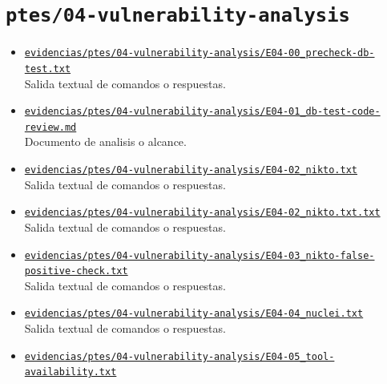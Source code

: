 \section{\texorpdfstring{\nolinkurl{ptes/04-vulnerability-analysis}}{ptes/04-vulnerability-analysis}}
\begin{itemize}[leftmargin=1.2em]
  \item \href{https://github.com/gamurigm/inventrack-ptes-report/blob/main/evidencias/ptes/04-vulnerability-analysis/E04-00_precheck-db-test.txt}{\nolinkurl{evidencias/ptes/04-vulnerability-analysis/E04-00_precheck-db-test.txt}}\\
  {\small Salida textual de comandos o respuestas.}
  \item \href{https://github.com/gamurigm/inventrack-ptes-report/blob/main/evidencias/ptes/04-vulnerability-analysis/E04-01_db-test-code-review.md}{\nolinkurl{evidencias/ptes/04-vulnerability-analysis/E04-01_db-test-code-review.md}}\\
  {\small Documento de analisis o alcance.}
  \item \href{https://github.com/gamurigm/inventrack-ptes-report/blob/main/evidencias/ptes/04-vulnerability-analysis/E04-02_nikto.txt}{\nolinkurl{evidencias/ptes/04-vulnerability-analysis/E04-02_nikto.txt}}\\
  {\small Salida textual de comandos o respuestas.}
  \item \href{https://github.com/gamurigm/inventrack-ptes-report/blob/main/evidencias/ptes/04-vulnerability-analysis/E04-02_nikto.txt.txt}{\nolinkurl{evidencias/ptes/04-vulnerability-analysis/E04-02_nikto.txt.txt}}\\
  {\small Salida textual de comandos o respuestas.}
  \item \href{https://github.com/gamurigm/inventrack-ptes-report/blob/main/evidencias/ptes/04-vulnerability-analysis/E04-03_nikto-false-positive-check.txt}{\nolinkurl{evidencias/ptes/04-vulnerability-analysis/E04-03_nikto-false-positive-check.txt}}\\
  {\small Salida textual de comandos o respuestas.}
  \item \href{https://github.com/gamurigm/inventrack-ptes-report/blob/main/evidencias/ptes/04-vulnerability-analysis/E04-04_nuclei.txt}{\nolinkurl{evidencias/ptes/04-vulnerability-analysis/E04-04_nuclei.txt}}\\
  {\small Salida textual de comandos o respuestas.}
  \item \href{https://github.com/gamurigm/inventrack-ptes-report/blob/main/evidencias/ptes/04-vulnerability-analysis/E04-05_tool-availability.txt}{\nolinkurl{evidencias/ptes/04-vulnerability-analysis/E04-05_tool-availability.txt}}\\

\end{itemize}
